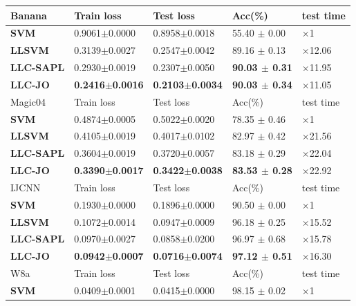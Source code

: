 \documentclass{llncs}
\begin{document}
	\begin{table}
		\begin{tabu} to \textwidth {|X[c]| X[c]| X[c]| X[c]| X[c]|}
			\hline
			Banana              & Train loss & Test loss & Acc(\%) &test time \\
			\hline
			\textbf{SVM} 		   	&0.9061$\pm$0.0000  &0.8958$\pm$0.0018  & 55.40 $\pm$ 0.00 & $\times$1  \\ \hline
			\textbf{LLSVM}     		&0.3139$\pm$0.0027  &0.2547$\pm$0.0042  & 89.16 $\pm$ 0.13 & $\times$12.06 \\ \hline
			\textbf{LLC-SAPL}       &0.2930$\pm$0.0019  &0.2307$\pm$0.0050  & \textbf{90.03 $\pm$ 0.31} &$\times$11.95 \\ \hline
			\textbf{LLC-JO}         &\textbf{0.2416$\pm$0.0016}  &\textbf{0.2103$\pm$0.0034}  & \textbf{90.03 $\pm$ 0.34} &$\times$11.05 \\ \hline
			\hline
			Magic04              & Train loss & Test loss & Acc(\%) &test time \\
			\hline
			\textbf{SVM} 		   	&0.4874$\pm$0.0005  &0.5022$\pm$0.0020  &78.35 $\pm$ 0.46  &$\times$1 \\ \hline
			\textbf{LLSVM}     		&0.4105$\pm$0.0019  &0.4017$\pm$0.0102  &82.97 $\pm$ 0.42  &$\times$21.56 \\ \hline
			\textbf{LLC-SAPL}       &0.3604$\pm$0.0019  &0.3720$\pm$0.0057  &83.18 $\pm$ 0.29  &$\times$22.04 \\ \hline
			\textbf{LLC-JO}         &\textbf{0.3390$\pm$0.0017}  &\textbf{0.3422$\pm$0.0038}  &\textbf{83.53 $\pm$ 0.28}   &$\times$22.92\\ \hline
			\hline
			IJCNN              & Train loss & Test loss & Acc(\%) &test time\\
			\hline
			\textbf{SVM} 		   	&0.1930$\pm$0.0000  &0.1896$\pm$0.0000  & 90.50 $\pm$ 0.00  &$\times$1\\ \hline
			\textbf{LLSVM}     		&0.1072$\pm$0.0014  &0.0947$\pm$0.0009  & 96.18 $\pm$ 0.25  &$\times$15.52\\ \hline
			\textbf{LLC-SAPL}       &0.0970$\pm$0.0027  &0.0858$\pm$0.0200  & 96.97 $\pm$ 0.68  &$\times$15.78\\ \hline
			\textbf{LLC-JO}         &\textbf{0.0942$\pm$0.0007}  &\textbf{0.0716$\pm$0.0074}  & \textbf{97.12 $\pm$ 0.51}   &$\times$16.30\\ \hline
				\hline
				W8a              & Train loss & Test loss & Acc(\%) &test time\\
				\hline
				\textbf{SVM} 		   	&0.0409$\pm$0.0001  &0.0415$\pm$0.0000  &98.15 $\pm$ 0.02  &$\times$1 \\ \hline

\end{tabu}
\end{table}
\end{document}
